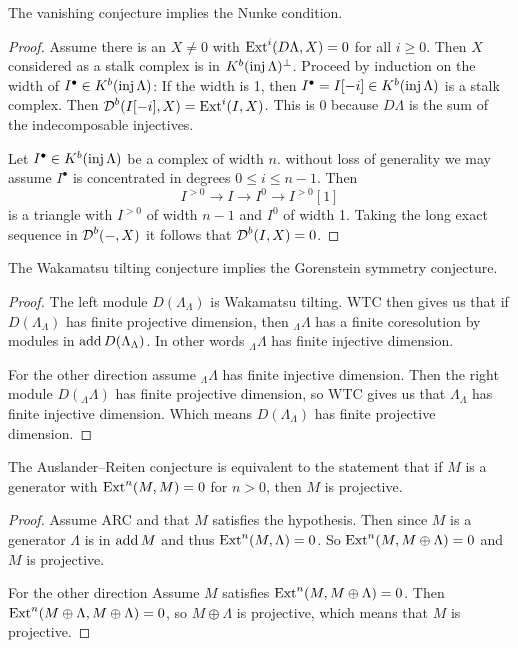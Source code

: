 \begin{theorem} \cite[1.2]{Hap93} \label{thm:VC_implies_Nuc}
	The vanishing conjecture implies the Nunke condition.
	\begin{proof}
		Assume there is an $X \neq 0$ with $\operatorname{Ext}^i(D\Lambda, X) = 0$ for all $i \geq 0$. Then $X$ considered as a stalk complex is in $K^b(\operatorname{inj}\Lambda)^\perp$. Proceed by induction on the width of $I^\bullet \in K^b(\operatorname{inj}\Lambda)$: If the width is 1, then $I^\bullet = I[-i] \in K^b(\operatorname{inj}\Lambda)$ is a stalk complex. Then $\operatorname{\mathcal{D}}^b(I[-i], X) = \operatorname{Ext}^i(I, X)$. This is 0 because $D\Lambda$ is the sum of the indecomposable injectives.
		
		Let $I^\bullet \in K^b(\operatorname{inj}\Lambda)$ be a complex of width $n$. without loss of generality we may assume $I^\bullet$ is concentrated in degrees $0 \leq i \leq n-1$. Then $$I^{>0} \to I \to I^{0} \to I^{>0}[1]$$ is a triangle with $I^{>0}$ of width $n-1$ and $I^0$ of width 1. Taking the long exact sequence in $\operatorname{\mathcal{D}}^b(-,X)$ it follows that $\operatorname{\mathcal{D}}^b(I, X)=0$. 
	\end{proof}
\end{theorem}

\begin{theorem}
	The Wakamatsu tilting conjecture implies the Gorenstein symmetry conjecture.
	\begin{proof}
	The left module $D(\Lambda_\Lambda)$ is Wakamatsu tilting. WTC then gives us that if $D(\Lambda_\Lambda)$ has finite projective dimension, then $_\Lambda\Lambda$ has a finite coresolution by modules in $\operatorname{add} D(\Lambda_\Lambda)$. In other words $_\Lambda\Lambda$ has finite injective dimension.
	
	For the other direction assume $_\Lambda\Lambda$ has finite injective dimension. Then the right module $D(_\Lambda\Lambda)$ has finite projective dimension, so WTC gives us that $\Lambda_\Lambda$ has finite injective dimension. Which means $D(\Lambda_\Lambda)$ has finite projective dimension.
	\end{proof}
\end{theorem}

\begin{prop}
	The Auslander--Reiten conjecture is equivalent to the statement that if $M$ is a generator with $\operatorname{Ext}^n(M, M) = 0$ for $n > 0$, then $M$ is projective.
	\begin{proof}
		Assume ARC and that $M$ satisfies the hypothesis. Then since $M$ is a generator $\Lambda$ is in $\operatorname{add} M$ and thus $\operatorname{Ext}^n(M, \Lambda)=0$. So $\operatorname{Ext}^n(M, M\oplus \Lambda)=0$ and $M$ is projective.
		
		For the other direction Assume $M$ satisfies $\operatorname{Ext}^n(M, M \oplus \Lambda)=0$. Then $\operatorname{Ext}^n(M \oplus \Lambda, M\oplus \Lambda) = 0$, so $M \oplus \Lambda$ is projective, which means that $M$ is projective. 
	\end{proof}
\end{prop}

